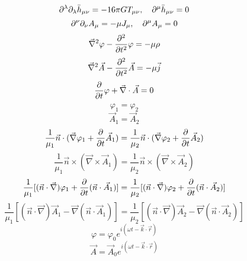 \begin{equation}
    \partial^{\lambda}\partial_{\lambda}\bar{h}_{\mu\nu}=-16\pi GT_{\mu \nu},\quad
    \partial^{\mu}\bar{h}_{\mu\nu}=0
\end{equation}
\begin{equation}
    \partial^{\nu}\partial_{\nu}A_{\mu}=-\mu J_{\mu},\quad
    \partial^{\mu}A_{\mu}=0
\end{equation}
\begin{equation}
    \vec{\nabla}^2\varphi-\frac{\partial^2}{\partial t^2}\varphi=-\mu\rho
\end{equation}
\begin{equation}
    \vec{\nabla}^2\vec{A}-\frac{\partial^2}{\partial t^2}\vec{A}=-\mu\vec{j}
\end{equation}
\begin{equation}
    \frac{\partial}{\partial t}\varphi+\vec{\nabla}\cdot\vec{A}=0
\end{equation}
\begin{equation}
    \varphi_1=\varphi_2
\end{equation}
\begin{equation}
    \vec{A}_1=\vec{A}_2
\end{equation}
\begin{equation}
    \frac{1}{\mu_1}\vec{n}\cdot(\vec{\nabla}\varphi_1+\frac{\partial}{\partial t}\vec{A}_1)=\frac{1}{\mu_2}\vec{n}\cdot(\vec{\nabla}\varphi_2+\frac{\partial}{\partial t}\vec{A}_2)
\end{equation}
\begin{equation}
    \frac{1}{\mu_1}\vec{n}\times(\vec{\nabla}\times\vec{A}_1)=\frac{1}{\mu_2}\vec{n}\times(\vec{\nabla}\times\vec{A}_2)
\end{equation}
\begin{equation}
    \frac{1}{\mu_1}[(\vec{n}\cdot\vec{\nabla})\varphi_1+\frac{\partial}{\partial t}(\vec{n}\cdot\vec{A}_1)]=\frac{1}{\mu_2}[(\vec{n}\cdot\vec{\nabla})\varphi_2+\frac{\partial}{\partial t}(\vec{n}\cdot\vec{A}_2)]
\end{equation}
\begin{equation}
    \frac{1}{\mu_1}[(\vec{n}\cdot\vec{\nabla})\vec{A}_1-\vec{\nabla}(\vec{n}\cdot\vec{A}_1)]=\frac{1}{\mu_2}[(\vec{n}\cdot\vec{\nabla})\vec{A}_2-\vec{\nabla}(\vec{n}\cdot\vec{A}_2)]
\end{equation}
\begin{equation}
    \varphi=\varphi_0e^{i(\omega t-\vec{k}\cdot\vec{r})}
\end{equation}
\begin{equation}
    \vec{A}=\vec{A}_0e^{i(\omega t-\vec{k}\cdot\vec{r})}
\end{equation}
